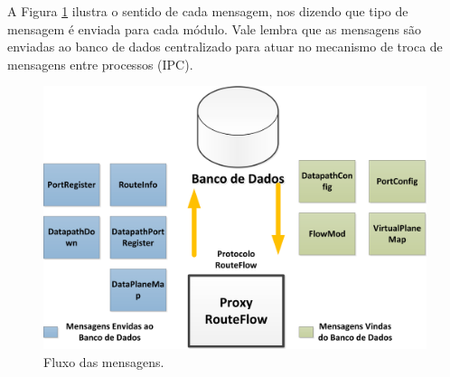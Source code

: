 A Figura \ref{fig:mensagens}
ilustra o sentido de cada mensagem, nos dizendo que tipo de mensagem
é enviada para cada módulo. Vale lembra que as mensagens
são enviadas ao banco de dados centralizado para atuar no
mecanismo de troca de mensagens entre processos (IPC).
\newline

\begin{figure}[h] 
\centering
\includegraphics[width=140mm]{mensagens.png}
\caption{Fluxo das mensagens.}
\label{fig:mensagens} 
\end{figure}

